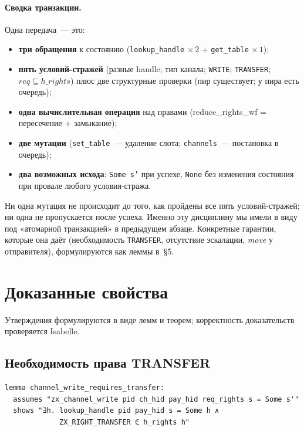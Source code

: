 \documentclass[11pt,a4paper]{article}
\newcommand{\isabel}[1]{{\isabelleit #1}}
\newcommand{\lemmaname}[1]{\isabel{#1}}
\begin{document}
\paragraph{Сводка транзакции.}
Одна передача~--- это:
\begin{itemize}[leftmargin=1.4em]
	\item \textbf{три обращения} к состоянию (\texttt{lookup\_handle}
	      $\times\,2$ + \texttt{get\_table} $\times\,1$);
	\item \textbf{пять условий-стражей} (разные handle; тип канала; \texttt{WRITE};
	      \texttt{TRANSFER}; $\mathit{req}\subseteq h\_rights$) плюс две
	      структурные проверки (пир существует; у пира есть очередь);
	\item \textbf{одна вычислительная операция} над правами
	      (\lemmaname{reduce\_rights\_wf} = пересечение + замыкание);
	\item \textbf{две мутации} (\texttt{set\_table}~--- удаление слота;
	      \texttt{channels}~--- постановка в очередь);
	\item \textbf{два возможных исхода}: \texttt{Some s'} при успехе,
	      \texttt{None} без изменения состояния при провале любого
	      условия-стража.
\end{itemize}
Ни одна мутация не происходит до того, как пройдены все пять условий-стражей;
ни одна не пропускается после успеха. Именно эту дисциплину мы имели в
виду под «атомарной транзакцией» в предыдущем абзаце. Конкретные
гарантии, которые она даёт (необходимость \texttt{TRANSFER}, отсутствие
эскалации, \emph{move} у отправителя), формулируются как леммы в~§5.

\section{Доказанные свойства}

Утверждения формулируются в виде лемм и теорем; корректность доказательств
проверяется Isabelle.

\subsection{Необходимость права TRANSFER}

\begin{lstlisting}
lemma channel_write_requires_transfer:
  assumes "zx_channel_write pid ch_hid pay_hid req_rights s = Some s'"
  shows "∃h. lookup_handle pid pay_hid s = Some h ∧
             ZX_RIGHT_TRANSFER ∈ h_rights h"
\end{lstlisting}
\end{document}
